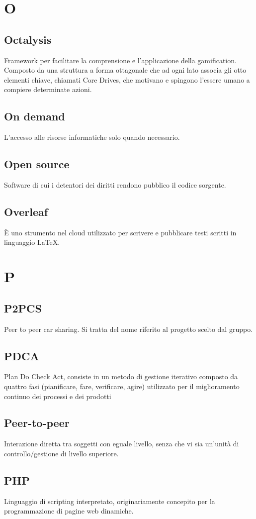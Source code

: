 \section{O}
\subsection*{Octalysis} Framework per facilitare la comprensione e l'applicazione della gamification. Composto da una struttura a forma ottagonale che ad ogni lato associa  gli otto elementi chiave, chiamati Core Drives, che motivano e spingono l'essere umano a compiere determinate azioni.
\subsection*{On demand} L'accesso alle risorse informatiche solo quando necessario.
\subsection*{Open source} Software di cui i detentori dei diritti rendono pubblico il codice sorgente.
\subsection*{Overleaf} È uno strumento nel cloud utilizzato per scrivere e pubblicare testi scritti in linguaggio LaTeX.
\newpage
\section{P}
\subsection*{P2PCS} Peer to peer car sharing. Si tratta del nome riferito al progetto scelto dal gruppo.
\subsection*{PDCA} Plan Do Check Act, consiste in un metodo di gestione iterativo composto da quattro fasi (pianificare, fare, verificare, agire) utilizzato per il miglioramento continuo dei processi e dei prodotti
\subsection*{Peer-to-peer} Interazione diretta tra soggetti con eguale livello, senza che vi sia un’unità di controllo/gestione di livello superiore.
\subsection*{PHP} Linguaggio di scripting interpretato, originariamente concepito per la programmazione di pagine web dinamiche.
